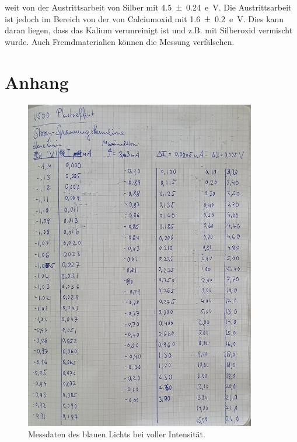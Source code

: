 \noindent weit von der Austrittsarbeit von Silber mit \qty{4.5\pm0.24}{e \volt}\cite{Austrittsarbeit}. Die Austrittsarbeit ist jedoch 
im Bereich von der von Calciumoxid mit \qty{1.6\pm0.2}{e \volt}. Dies kann daran liegen, dass das Kalium verunreinigt ist und z.B. 
mit Silberoxid vermischt wurde. Auch Fremdmaterialien können die Messung verfälschen. 

\section{Anhang}

\begin{figure}
    \centering
    \includegraphics[width=0.9\textwidth]{content/Laborbuch_voll.jpg}
    \caption{Messdaten des blauen Lichts bei voller Intensität.}
\end{figure}

